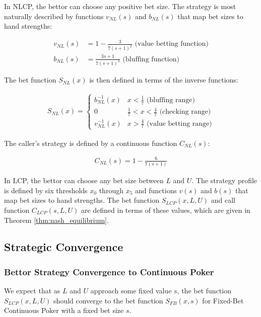 \documentclass[a4paper,12pt]{article}
\theoremstyle{plain}
\theoremstyle{definition}
\begin{document}
In NLCP, the bettor can choose any positive bet size. The strategy is most naturally described by functions $v_{NL}(s)$ and $b_{NL}(s)$ that map bet sizes to hand strengths:

\begin{align*}
    v_{NL}(s) &= 1 - \frac{3}{7(s+1)^2} \text{ (value betting function)} \\
    b_{NL}(s) &= \frac{3s+1}{7(s+1)^3} \text{ (bluffing function)}
\end{align*}

The bet function $S_{NL}(x)$ is then defined in terms of the inverse functions:

\begin{align*}
    S_{NL}(x) = \begin{cases}
        b_{NL}^{-1}(x) & x < \frac{1}{7} \text{ (bluffing range)} \\
        0 & \frac{1}{7} < x < \frac{4}{7} \text{ (checking range)} \\
        v_{NL}^{-1}(x) & x > \frac{4}{7} \text{ (value betting range)}
    \end{cases}
\end{align*}

The caller's strategy is defined by a continuous function $C_{NL}(s)$:

\begin{align*}
    C_{NL}(s) = 1 - \frac{6}{7 (s+1)}
\end{align*}

In LCP, the bettor can choose any bet size between $L$ and $U$. The strategy profile is defined by six thresholds $x_0$ through $x_5$ and functions $v(s)$ and $b(s)$ that map bet sizes to hand strengths. The bet function $S_{LCP}(x, L, U)$ and call function $C_{LCP}(s, L, U)$ are defined in terms of these values, which are given in Theorem \ref{thm:nash_equilibrium}.

\subsection{Strategic Convergence}
\label{sec:strategic_convergence}

\subsubsection{Bettor Strategy Convergence to Continuous Poker}
We expect that as $L$ and $U$ approach some fixed value $s$, the bet function $S_{LCP}(x, L, U)$ should converge to the bet function $S_{FB}(x, s)$ for Fixed-Bet Continuous Poker with a fixed bet size $s$. 
\end{document}
